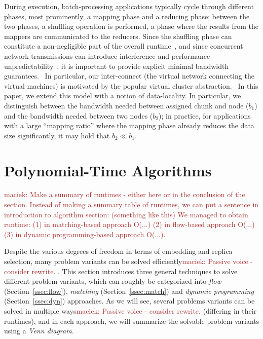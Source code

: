 \documentclass[9pt]{sigcomm-alternate}
\newcommand{\maciek}[1]{\textcolor{brown}{maciek: #1}}
\newcommand{\CostTrans}{\ensuremath{b_1}}
\newcommand{\CostCom}{\ensuremath{b_2}}
\begin{document}
During execution, batch-processing applications typically cycle through different phases,
most prominently, a mapping phase and a reducing phase; between the two phases,
a shuffling operation is performed, a phase where the results from the mappers
are communicated to the reducers. Since the shuffling phase can constitute a
non-negligible part of the overall runtime~\cite{orchestra},
and since concurrent network transmissions can introduce interference and
performance unpredictability~\cite{amazonbw}, it is important
to provide explicit minimal bandwidth guarantees.~\cite{talk-about}
In particular, our inter-connect (the virtual network connecting the virtual machines)
is motivated by the popular virtual cluster abstraction.~\cite{oktopus,talk-about,proteus}
In this paper, we extend this model with a notion of data-locality.
In particular, we distinguish between the bandwidth needed between assigned chunk
and node ($\CostTrans$) and the bandwidth needed between
two nodes ($\CostCom$); in practice, for applications with a large
``mapping ratio'' where the mapping phase already reduces the data size significantly,
it may hold that $\CostCom\ll\CostTrans$. 

\section{Polynomial-Time Algorithms}\label{sec:poly}

\maciek{Make a summary of runtimes - either here or in the conclusion of the section. Instead of making a summary table of runtimes, we can put a sentence in introduction to algorithm section: (something like this) We managed to obtain runtime: (1) in matching-based approach O(...) (2) in flow-based approach O(...) (3) in dynamic programming-based approach O(...). }


Despite the various degrees of freedom in terms of embedding and replica selection,
 many problem variants can be solved efficiently\maciek{Passive voice - consider rewrite.}
.
 This section introduces three general techniques to solve different problem variants,
 which can roughly be categorized into
 \emph{flow} (Section~\ref{ssec:flow}), \emph{matching} (Section~\ref{ssec:match}) and \emph{dynamic programming}
 (Section~\ref{ssec:dyn}) approaches.
 As we will see, several problems variants can be solved in multiple ways\maciek{Passive voice - consider rewrite.}
 (differing in their runtimes),
 and in each approach, we will summarize the solvable problem variants using a \emph{Venn diagram}.
\end{document}
